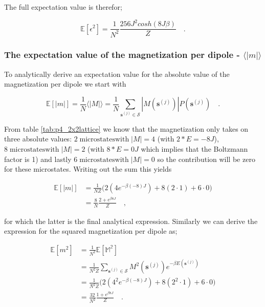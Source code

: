 \documentclass[../main_proj4_correct_template.tex]{subfiles}
\begin{document}
\noindent The full expectation value is therefor;

\begin{equation*}
    \mathbb{E}[\epsilon^{2}] = \frac{1}{N^{2}}\frac{256 J^{2} cosh(8J\beta)}{Z} \quad.
\end{equation*}



\subsubsection{The expectation value of the magnetization per dipole - $\langle |m|\rangle$}

To analytically derive an expectation value for the absolute value of the magnetization per dipole we start with 

\begin{equation*}
    \mathbb{E}[|m|] = \frac{1}{N} \langle|M|\rangle = \frac{1}{N} \sum\limits_{\mathbf{s}^{(j)} \in \mathcal{S}} |M(\mathbf{s}^{(j)})| P(\mathbf{s}^{(j)}) \quad.
\end{equation*}

\noindent From table \ref{tab:p4_2x2lattice} we know that the magnetization only takes on three absolute values: $2\operatorname{microstates with }|M|=4$ (with $2*E=-8J$), $8\operatorname{microstates with }|M|=2$ (with $8*E=0J$ which implies that the Boltzmann factor is 1) and lastly $6\operatorname{microstates with }|M|=0$ so the contribution will be zero for these microstates. Writing out the sum this yields

\begin{equation*}
\begin{split}
    \mathbb{E}[|m|] &= \frac{1}{NZ}\bigg( 2(4 e^{-\beta(-8)J}) +8(2\cdot1) + 6\cdot 0\bigg) \\
    &= \frac{8}{N} \frac{2+e^{\beta 8 J}}{Z} \quad,
\end{split}   
\end{equation*}

\noindent for which the latter is the final analytical expression. Similarly we can derive the expression for the squared magnetization per dipole as; 

\begin{equation*}
\begin{split}
    \mathbb{E}[m^{2}] & = \frac{1}{N^{2}} \mathbb{E[M^{2}]} \\
    &= \frac{1}{N^{2}Z} \sum\limits_{\mathbf{s}^{(j)} \in \mathcal{S}} M^{2}(\mathbf{s}^{(j)})e^{-\beta E(\mathbf{s}^{(j)})} \\
    &= \frac{1}{N̂^{2}Z} \bigg( 2(4^{2} e^{-\beta(-8)J}) +8(2^{2}\cdot1) + 6\cdot 0\bigg) \\
    &= \frac{32}{N^{2}} \frac{1+ e^{\beta 8J}}{Z} \quad.
\end{split}
\end{equation*}
\end{document}
